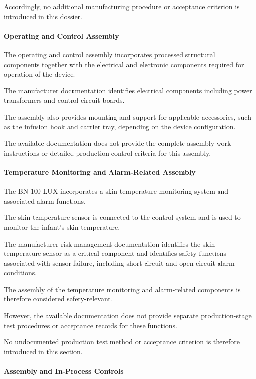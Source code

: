 Accordingly, no additional manufacturing procedure or acceptance
criterion is introduced in this dossier.

\paragraph{Operating and Control Assembly}

The operating and control assembly incorporates processed structural
components together with the electrical and electronic components
required for operation of the device.

The manufacturer documentation identifies electrical components
including power transformers and control circuit boards.

The assembly also provides mounting and support for applicable
accessories, such as the infusion hook and carrier tray, depending
on the device configuration.

The available documentation does not provide the complete assembly
work instructions or detailed production-control criteria for this
assembly.



\paragraph{Temperature Monitoring and Alarm-Related Assembly}

The BN-100 LUX incorporates a skin temperature monitoring system
and associated alarm functions.

The skin temperature sensor is connected to the control system and
is used to monitor the infant's skin temperature.

The manufacturer risk-management documentation identifies the skin
temperature sensor as a critical component and identifies safety
functions associated with sensor failure, including short-circuit
and open-circuit alarm conditions.

The assembly of the temperature monitoring and alarm-related
components is therefore considered safety-relevant.

However, the available documentation does not provide separate
production-stage test procedures or acceptance records for these
functions.

No undocumented production test method or acceptance criterion is
therefore introduced in this section.

\paragraph{Assembly and In-Process Controls}

